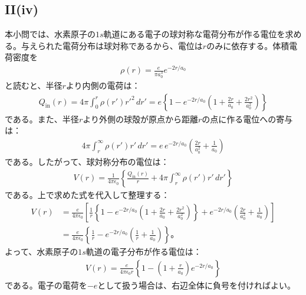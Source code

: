 \documentclass[platex,dvipdfmx,a4paper]{jsarticle}
\begin{document}
  \subsection*{II(iv)}
  本小問では、水素原子の$1s$軌道にある電子の球対称な電荷分布が作る電位を求める。与えられた電荷分布は球対称であるから、電位は$r$のみに依存する。体積電荷密度を
  \begin{align*}
    \rho(r)=\frac{e}{\pi a_0^3}e^{-2r/a_0}
  \end{align*}
  と読むと、半径$r$より内側の電荷は：
  \begin{align*}
    Q_{\mathrm{in}}(r)=4\pi\int_0^r\rho(r')r'^2\,dr'=e\left\{1-e^{-2r/a_0}\left(1+\frac{2r}{a_0}+\frac{2r^2}{a_0^2}\right)\right\}
  \end{align*}
  である。また、半径$r$より外側の球殻が原点から距離$r$の点に作る電位への寄与は：
  \begin{align*}
    4\pi\int_r^\infty \rho(r')r'\,dr'=e\,e^{-2r/a_0}\left(\frac{2r}{a_0^2}+\frac{1}{a_0}\right)
  \end{align*}
  である。したがって、球対称分布の電位は：
  \begin{align*}
    V(r)=\frac{1}{4\pi\epsilon_0}\left\{\frac{Q_{\mathrm{in}}(r)}{r}+4\pi\int_r^\infty \rho(r')r'\,dr'\right\}
  \end{align*}
  である。上で求めた式を代入して整理する：
  \begin{align*}
    V(r)&=\frac{e}{4\pi\epsilon_0}\left[\frac{1}{r}\left\{1-e^{-2r/a_0}\left(1+\frac{2r}{a_0}+\frac{2r^2}{a_0^2}\right)\right\}+e^{-2r/a_0}\left(\frac{2r}{a_0^2}+\frac{1}{a_0}\right)\right] \\
        &=\frac{e}{4\pi\epsilon_0}\left\{\frac{1}{r}-e^{-2r/a_0}\left(\frac{1}{r}+\frac{1}{a_0}\right)\right\}。
  \end{align*}
  よって、水素原子の$1s$軌道の電子分布が作る電位は：
  \begin{align*}
    V(r)=\frac{e}{4\pi\epsilon_0 r}\left\{1-\left(1+\frac{r}{a_0}\right)e^{-2r/a_0}\right\}
  \end{align*}
  である。電子の電荷を$-e$として扱う場合は、右辺全体に負号を付ければよい。  
\end{document}
